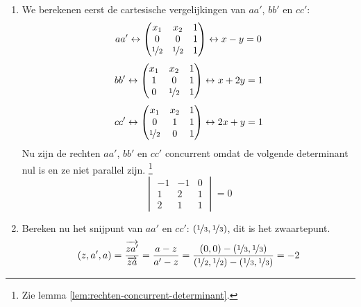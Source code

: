 \documentclass[main.tex]{subfiles}
\begin{document}
\begin{enumerate}
\item
  We berekenen eerst de cartesische vergelijkingen van $aa'$, $bb'$ en $cc'$:
  \[
  aa' \leftrightarrow
  \begin{pmatrix}
    x_{1} & x_{2} & 1\\
    0 & 0 & 1\\
    \nicefrac{1}{2} & \nicefrac{1}{2} & 1\\
  \end{pmatrix}
  \leftrightarrow
  x-y = 0
  \]
  \[
  bb' \leftrightarrow
  \begin{pmatrix}
    x_{1} & x_{2} & 1\\
    1 & 0 & 1\\
    0 & \nicefrac{1}{2} & 1\\
  \end{pmatrix}
  \leftrightarrow
  x+2y = 1
  \]
  \[
  cc' \leftrightarrow
  \begin{pmatrix}
    x_{1} & x_{2} & 1\\
    0 & 1 & 1\\
    \nicefrac{1}{2} &0 & 1\\
  \end{pmatrix}
  \leftrightarrow
  2x+y = 1
  \]
  Nu zijn de rechten $aa'$, $bb'$ en $cc'$ concurrent omdat de volgende determinant nul is en ze niet parallel zijn. \footnote{Zie lemma \ref{lem:rechten-concurrent-determinant}.}
  \[
  \begin{vmatrix}
    -1 & -1 & 0\\
    1 & 2 & 1\\
    2 & 1 & 1
  \end{vmatrix}
  =0
  \]
\item Bereken nu het snijpunt van $aa'$ en $cc'$: $(\nicefrac{1}{3},\nicefrac{1}{3})$, dit is het zwaartepunt.
  \[ (z,a',a) = \frac{\overrightarrow{za'}}{\overrightarrow{za}} =\frac{a-z}{a'-z} = \frac{(0,0)-(\nicefrac{1}{3},\nicefrac{1}{3})}{(\nicefrac{1}{2}, \nicefrac{1}{2})-(\nicefrac{1}{3},\nicefrac{1}{3})} = -2\]
\end{enumerate}
\end{document}
